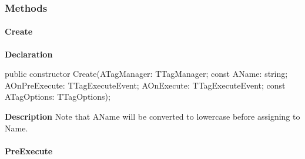 \documentclass{report}
\newif\ifpdf
\begin{document}
\subsubsection*{\large{\textbf{Methods}}\normalsize\hspace{1ex}\hfill}
\paragraph*{Create}\hspace*{\fill}

\label{PasDoc_TagManager.TTag-Create}
\begin{list}{}{
\setlength{\itemindent}{0cm}
\setlength{\listparindent}{0cm}
\setlength{\leftmargin}{\evensidemargin}
\addtolength{\leftmargin}{\tmplength}
\settowidth{\labelsep}{X}
\addtolength{\leftmargin}{\labelsep}
\setlength{\labelwidth}{\tmplength}
}
\item[\textbf{Declaration}\hfill]
\ifpdf
\begin{flushleft}
\fi
\begin{ttfamily}
public constructor Create(ATagManager: TTagManager; const AName: string; AOnPreExecute: TTagExecuteEvent; AOnExecute: TTagExecuteEvent; const ATagOptions: TTagOptions);\end{ttfamily}

\ifpdf
\end{flushleft}
\fi

\par
\item[\textbf{Description}]
Note that AName will be converted to lowercase before assigning to Name.

\end{list}
\paragraph*{PreExecute}\hspace*{\fill}
\end{document}
